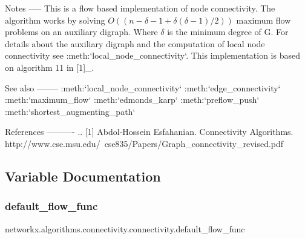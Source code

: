\begin{DoxyVerb}
Notes
-----
This is a flow based implementation of node connectivity. The
algorithm works by solving $O((n-\delta-1+\delta(\delta-1)/2))$
maximum flow problems on an auxiliary digraph. Where $\delta$
is the minimum degree of G. For details about the auxiliary
digraph and the computation of local node connectivity see
:meth:`local_node_connectivity`. This implementation is based
on algorithm 11 in [1]_.

See also
--------
:meth:`local_node_connectivity`
:meth:`edge_connectivity`
:meth:`maximum_flow`
:meth:`edmonds_karp`
:meth:`preflow_push`
:meth:`shortest_augmenting_path`

References
----------
.. [1] Abdol-Hossein Esfahanian. Connectivity Algorithms.
    http://www.cse.msu.edu/~cse835/Papers/Graph_connectivity_revised.pdf\end{DoxyVerb}
 

\subsection{Variable Documentation}
\mbox{\label{namespacenetworkx_1_1algorithms_1_1connectivity_1_1connectivity_ab2b3805544e8db35b37956f9d3d42794}} 
\subsubsection{\texorpdfstring{default\+\_\+flow\+\_\+func}{default\_flow\_func}}
{\footnotesize\ttfamily networkx.\+algorithms.\+connectivity.\+connectivity.\+default\+\_\+flow\+\_\+func}


